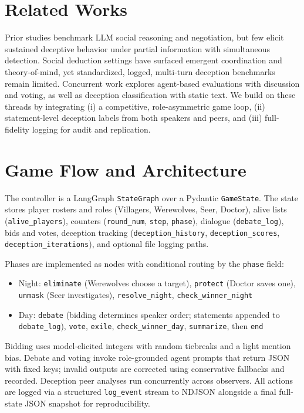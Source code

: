 \documentclass[12pt]{article}
\begin{document}
\section{Related Works}
Prior studies benchmark LLM social reasoning and negotiation, but few elicit sustained deceptive behavior under partial information with simultaneous detection. Social deduction settings have surfaced emergent coordination and theory-of-mind, yet standardized, logged, multi-turn deception benchmarks remain limited. Concurrent work explores agent-based evaluations with discussion and voting, as well as deception classification with static text. We build on these threads by integrating (i) a competitive, role-asymmetric game loop, (ii) statement-level deception labels from both speakers and peers, and (iii) full-fidelity logging for audit and replication.

\section{Game Flow and Architecture}
The controller is a LangGraph \texttt{StateGraph} over a Pydantic \texttt{GameState}. The state stores player rosters and roles (Villagers, Werewolves, Seer, Doctor), alive lists (\texttt{alive\_players}), counters (\texttt{round\_num}, \texttt{step}, \texttt{phase}), dialogue (\texttt{debate\_log}), bids and votes, deception tracking (\texttt{deception\_history}, \texttt{deception\_scores}, \texttt{deception\_iterations}), and optional file logging paths.

Phases are implemented as nodes with conditional routing by the \texttt{phase} field:
\begin{itemize}
  \item Night: \texttt{eliminate} (Werewolves choose a target), \texttt{protect} (Doctor saves one), \texttt{unmask} (Seer investigates), \texttt{resolve\_night}, \texttt{check\_winner\_night}
  \item Day: \texttt{debate} (bidding determines speaker order; statements appended to \texttt{debate\_log}), \texttt{vote}, \texttt{exile}, \texttt{check\_winner\_day}, \texttt{summarize}, then \texttt{end}
\end{itemize}

Bidding uses model-elicited integers with random tiebreaks and a light mention bias. Debate and voting invoke role-grounded agent prompts that return JSON with fixed keys; invalid outputs are corrected using conservative fallbacks and recorded. Deception peer analyses run concurrently across observers. All actions are logged via a structured \texttt{log\_event} stream to NDJSON alongside a final full-state JSON snapshot for reproducibility.
\end{document}
